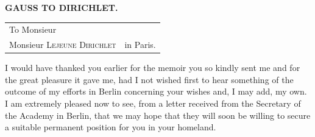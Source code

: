 \clearpage\renewcommand{\BookRunningTitle}{Gauss to Dirichlet.}
\begingroup\fontsize{10.5}{12}\selectfont
{}
\begin{center}\textbf{GAUSS TO DIRICHLET.}\end{center}
\begin{center}
\begin{tabular}{ll}
\hline
To Monsieur&\\
\quad Monsieur \textsc{Lejeune Dirichlet}&\quad in Paris.\\
\hline
\end{tabular}
\end{center}
I would have thanked you earlier for the memoir you so kindly sent me and for the great pleasure it gave me, had I not wished first to hear something of the outcome of my efforts in Berlin concerning your wishes and, I may add, my own. I am extremely pleased now to see, from a letter received from the Secretary of the Academy in Berlin, that we may hope that they will soon be willing to secure a suitable permanent position for you in your homeland.
